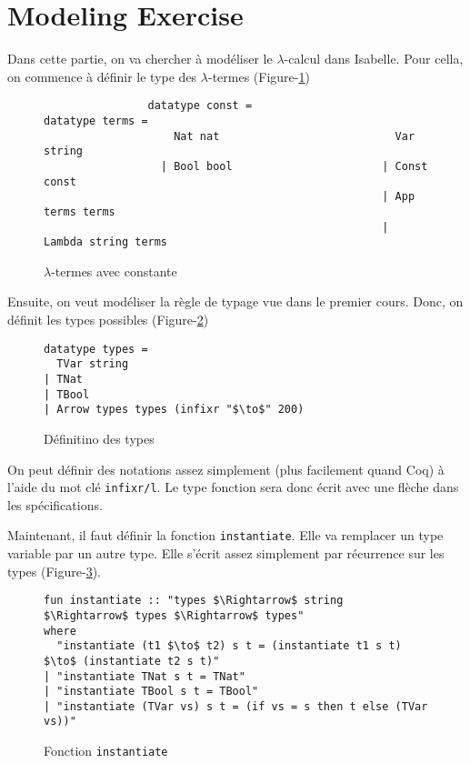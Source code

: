 \documentclass{article}
\theoremstyle{plain}
\begin{document}
\section{Modeling Exercise}

Dans cette partie, on va chercher à modéliser le $\lambda$-calcul dans Isabelle.
Pour cella, on commence à définir le type des $\lambda$-termes
(Figure-\ref{fig:lambda})

  \begin{figure}[thpb]
  \begin{lstlisting}
                datatype const =                    datatype terms =
                    Nat nat                           Var string
                  | Bool bool                       | Const const
                                                    | App terms terms
                                                    | Lambda string terms
  \end{lstlisting}
  \caption{$\lambda$-termes avec constante}
  \label{fig:lambda}
  \end{figure}

\newpage
Ensuite, on veut modéliser la règle de typage vue dans le premier cours. Donc,
on définit les types possibles (Figure-\ref{fig:types})

  \begin{figure}[thpb]
  \begin{lstlisting}
datatype types =
  TVar string
| TNat
| TBool
| Arrow types types (infixr "$\to$" 200)
  \end{lstlisting}
  \caption{Définitino des types}
  \label{fig:types}
  \end{figure}

On peut définir des notations assez simplement (plus facilement quand Coq) à
l'aide du mot clé \texttt{infixr/l}. Le type fonction sera donc écrit avec une
flèche dans les spécifications.

Maintenant, il faut définir la fonction \texttt{instantiate}. Elle va remplacer
un type variable par un autre type. Elle s'écrit assez simplement par récurrence
sur les types (Figure-\ref{fig:inst}).

  \begin{figure}[thpb]
  \begin{lstlisting}
fun instantiate :: "types $\Rightarrow$ string $\Rightarrow$ types $\Rightarrow$ types"
where
  "instantiate (t1 $\to$ t2) s t = (instantiate t1 s t) $\to$ (instantiate t2 s t)"
| "instantiate TNat s t = TNat"
| "instantiate TBool s t = TBool"
| "instantiate (TVar vs) s t = (if vs = s then t else (TVar vs))"
  \end{lstlisting}
  \caption{Fonction \texttt{instantiate}}
  \label{fig:inst}
  \end{figure}
\end{document}
